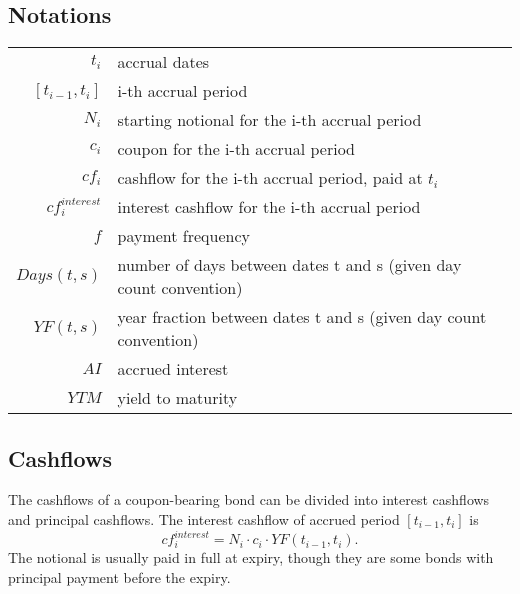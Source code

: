 \subsection{Notations}

\begin{table*}
\begin{tabular}{r | l}
\hline\hline
$t_i$ & accrual dates \\
$[t_{i-1},t_{i}]$ & i-th accrual period \\
$N_i$  & starting notional for the i-th accrual period \\
$c_i$  & coupon for the i-th accrual period \\
$cf_i$ & cashflow for the i-th accrual period, paid at $t_i$ \\
$cf_i^{interest}$ & interest cashflow for the i-th accrual period \\
$f$    & payment frequency \\
$Days(t,s)$ & number of days between dates t and s (given day count convention)\\
$YF(t,s)$   & year fraction between dates t and s (given day count convention)\\
$AI$   & accrued interest \\
$YTM$  & yield to maturity \\
\hline
\end{tabular}
\end{table*}

\subsection{Cashflows}

The cashflows of a coupon-bearing bond can be divided into interest cashflows
and principal cashflows. The interest cashflow of accrued period $[t_{i-1},t_i]$ 
is 
\begin{equation}
 cf_i^{interest} = N_i\cdot c_i \cdot YF(t_{i-1},t_{i}).
\end{equation}
The notional is usually paid in full at 
expiry, though they are some bonds with principal payment before the expiry.

